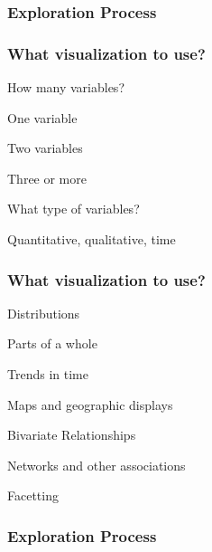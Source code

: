 \documentclass[12pt]{beamer}\usepackage[]{graphicx}\usepackage[]{color}
\begin{document}

\begin{frame}[fragile]
\frametitle{Exploration Process}
\begin{center}
\end{center}
\end{frame}


\begin{frame}
\frametitle{What visualization to use?}

\bi
  \item How many variables?
  \bi
    \item One variable
    \item Two variables
    \item Three or more
  \ei
  \item What type of variables?
  \item Quantitative, qualitative, time
\ei

\end{frame}


\begin{frame}
\frametitle{What visualization to use?}

\bi
  \item Distributions
  \item Parts of a whole
  \item Trends in time
  \item Maps and geographic displays
  \item Bivariate Relationships
  \item Networks and other associations
  \item Facetting
\ei

\end{frame}


\begin{frame}[fragile]
\frametitle{Exploration Process}
\begin{center}
\end{center}
\end{frame}

\end{document}
